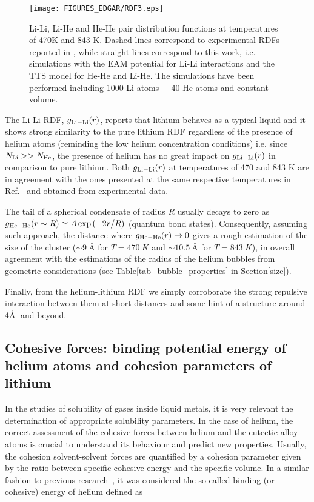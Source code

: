 \documentclass[jcp,amsmath,amssymb,preprint]{revtex4-1}
\begin{document}
\begin{figure}[htbp]
\begin{center}
\texttt{[image: FIGURES\_EDGAR/RDF3.eps]}
\caption{\label{fig:gdrs} Li-Li, Li-He and He-He pair distribution functions at temperatures of 470K and 843 K. Dashed lines correspond to experimental RDFs reported in \cite{canales1994computer}, while straight lines correspond to this work, i.e. simulations with the EAM potential for Li-Li interactions and the TTS model for He-He and Li-He.  The simulations have been performed including 1000 Li atoms + 40 He atoms and constant volume.}
 \label{fig_gdr}
\end{center}
\end{figure} 
            
The Li-Li RDF, $g_{\rm Li-Li}(r)$, reports that lithium behaves as a typical liquid and it shows strong similarity to the pure lithium RDF regardless of the presence of helium atoms (reminding the low helium concentration conditions) i.e.  since $N_{\rm Li} >> N_{\rm He}$, the presence of helium has no great impact on $g_{\rm Li-Li}(r)$ in comparison to pure lithium.  Both $g_{\rm Li-Li}(r)$ at temperatures of 470 and 843 K are in agreement with the ones presented at the same respective temperatures in Ref.~\cite{canales1994computer} and obtained from experimental data.

The tail of a spherical condensate of radius $R$ usually decays to zero as $g_{\rm He-He}(r \sim R) \simeq A \exp{(-2r/R)}$ (quantum bond states).  Consequently,  assuming such approach, the distance where $g_{\rm He-He}(r) \rightarrow 0$ gives a rough estimation of the size of the cluster ($\sim \SI{9}{\angstrom}$ for $T = \SI{470}{K}$ and $\sim \SI{10.5}{\angstrom}$ for $T = \SI{843}{K}$), in overall agreement with the estimations of the radius of the helium bubbles from geometric considerations (see Table\ref{tab_bubble_properties} in Section\ref{size}).
            
Finally,  from the helium-lithium RDF we simply corroborate the strong repulsive interaction between them at short distances 
and some hint of a structure around 4\AA$\;$ and beyond.

\subsection{\label{bind} Cohesive forces: binding potential energy of helium atoms and cohesion parameters of lithium}

In the studies of solubility of gases inside liquid metals, it is very relevant the determination of appropriate solubility parameters.
In the case of helium, the correct assessment of the cohesive forces between helium and the eutectic alloy atoms is crucial\cite{sedano2022solubility} to understand its behaviour and predict new properties.  Usually, the cohesion 
solvent-solvent forces are quantified by a cohesion parameter given by the ratio between specific cohesive energy and the specific volume.  In a similar fashion to previous research~\cite{marti2022nucleation},  it was considered the so called 
binding (or cohesive) energy of helium defined as
\end{document}

